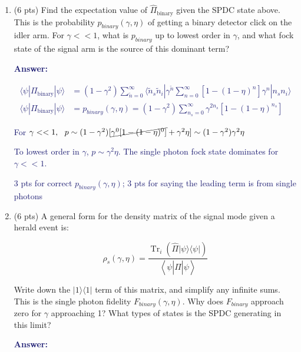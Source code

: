 \documentclass[11pt]{caltech_thesis} %
\begin{document}
\begin{enumerate}
\def\labelenumi{\arabic{enumi}.}
\item
  (6 pts) Find the expectation value of $\hat{\Pi}_{\text {binary}}$ given the SPDC state above. This is the probability $p_{binary}\left(\gamma, \eta\right)$ of getting a binary detector click on the idler arm. For $\gamma << 1$, what is $p_{binary}$ up to lowest order in $\gamma$, and what fock state of the signal arm is the source of this dominant term?

  \textcolor{midnightblue}{ \textbf{Answer:} }

  \textcolor{midnightblue}{

  $$\begin{aligned}
   \langle \psi | \Pi_{\text {binary}} | \psi \rangle &= (1- \gamma^2) \sum_{\tilde{n}=0}^{\infty} \langle \tilde{n}_s \tilde{n}_i | \gamma^{\tilde{n}} \sum_{n=0}^{\infty}[1 - (1-\eta)^{n}] \gamma^n | n_s n_i \rangle \\
   \langle \psi | \Pi_{\text {binary}} | \psi \rangle &= p_{binary}(\gamma, \eta) =  \boxed{(1-\gamma^2) \sum_{n_s=0}^{\infty} \gamma^{2n_s} [1 - (1 - \eta)^{n_s}]}
   \end{aligned}$$

  }

  \textcolor{midnightblue}{For $\gamma << 1, ~~ p \sim (1 - \gamma^2)[\cancel{\gamma^0[1 - (1 - \eta)^0]} + \gamma^{2}\eta ] \sim (1 - \gamma^2)\gamma^{2}\eta$ }

  \textcolor{midnightblue}{ To lowest order in $\gamma$, $p \sim \gamma^{2}\eta$. The single photon fock state dominates for $\gamma << 1$. }

  \textcolor{midnightblue}{ 3 pts for correct $p_{binary}(\gamma, \eta)$; 3 pts for saying the leading term is from single photons }
\item
  (6 pts) A general form for the density matrix of the signal mode given a herald event is:

  $$\rho_{s}\left(\gamma, \eta\right)=\frac{\operatorname{Tr}_{i}\left(\hat{\Pi}|\psi\rangle\langle\psi|\right)}{\left\langle\psi\left|\hat{\Pi}\right| \psi\right\rangle}$$

  Write down the $|1\rangle\langle1|$ term of this matrix, and simplify any infinite sums. This is the single photon fidelity $F_{binary}(\gamma, \eta)$. Why does $F_{binary}$ approach zero for $\gamma$ approaching 1? What types of states is the SPDC generating in this limit?

  \textcolor{midnightblue}{ \textbf{Answer:} }


\end{enumerate}
\end{document}
